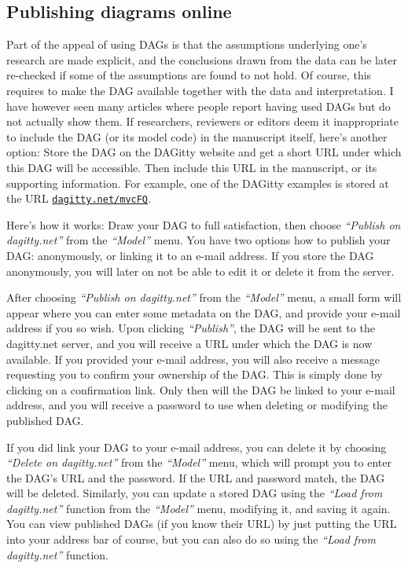 \documentclass[a4paper]{article} %
\newcommand{\pp}{{\sc DAG}itty\xspace}
\newcommand{\action}[1]{\emph{``#1''}}
\begin{document}
\subsection{Publishing diagrams online}

Part of the appeal of using DAGs is that the assumptions underlying
one's research are made explicit, and the conclusions drawn from 
the data can be later re-checked if some of the assumptions are found
to not hold. Of course, this requires to make the DAG available together
with the data and interpretation. I have however seen many articles
where people report having used DAGs but do not actually show them.
If researchers, reviewers or editors deem it inappropriate to include the 
DAG (or its model code) in the manuscript itself, here's another option:
Store the DAG on the \pp website and get a short URL under which
this DAG will be accessible. Then include this URL in the manuscript,
or its supporting information. For example, one of the \pp examples
is stored at the URL \href{http://dagitty.net/mvcFQ}{\tt dagitty.net/mvcFQ}.

Here's how it works: Draw your DAG to full satisfaction, then choose 
\action{Publish on dagitty.net} from the \action{Model} menu. You have
two options how to publish your DAG: anonymously, or linking it to an e-mail
address. If you store the DAG anonymously, you will later on not be able
to edit it or delete it from the server.

After choosing \action{Publish on dagitty.net} from the \action{Model} menu,
a small form will appear where you can enter some metadata on the DAG,
and provide your e-mail address if you so wish. Upon clicking \action{Publish},
the DAG will be sent to the dagitty.net server, and you will receive a URL under
which the DAG is now available. If you provided your e-mail address, you
will also receive a message requesting you to confirm your ownership of the DAG.
This is simply done by clicking on a confirmation link. Only then will the DAG
be linked to your e-mail address, and you will receive a password to use when
deleting or modifying the published DAG.

If you did link your DAG to your e-mail address, you can delete it by choosing
\action{Delete on dagitty.net} from the \action{Model} menu, which will prompt you
to enter the DAG's URL and the password. If the URL and password match,
the DAG will be deleted.
Similarly, you can update a stored DAG using the \action{Load from dagitty.net} function
from the  \action{Model} menu, modifying it, and saving it again. 
You can view published DAGs (if you know their URL)
by just putting the URL into your address bar of course, but you can also do
so using the \action{Load from dagitty.net} function. 
\end{document}
